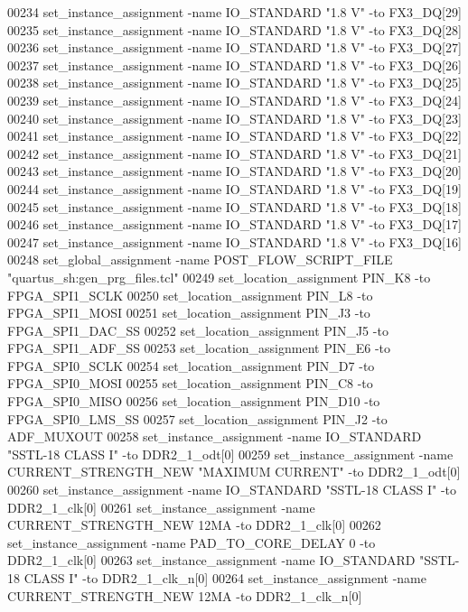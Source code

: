 \begin{DoxyCode}
00234 set\_instance\_assignment -name IO\_STANDARD "1.\textcolor{vhdllogic}{8} V" -to FX3\_DQ[29]
00235 set\_instance\_assignment -name IO\_STANDARD "1.\textcolor{vhdllogic}{8} V" -to FX3\_DQ[28]
00236 set\_instance\_assignment -name IO\_STANDARD "1.\textcolor{vhdllogic}{8} V" -to FX3\_DQ[27]
00237 set\_instance\_assignment -name IO\_STANDARD "1.\textcolor{vhdllogic}{8} V" -to FX3\_DQ[26]
00238 set\_instance\_assignment -name IO\_STANDARD "1.\textcolor{vhdllogic}{8} V" -to FX3\_DQ[25]
00239 set\_instance\_assignment -name IO\_STANDARD "1.\textcolor{vhdllogic}{8} V" -to FX3\_DQ[24]
00240 set\_instance\_assignment -name IO\_STANDARD "1.\textcolor{vhdllogic}{8} V" -to FX3\_DQ[23]
00241 set\_instance\_assignment -name IO\_STANDARD "1.\textcolor{vhdllogic}{8} V" -to FX3\_DQ[22]
00242 set\_instance\_assignment -name IO\_STANDARD "1.\textcolor{vhdllogic}{8} V" -to FX3\_DQ[21]
00243 set\_instance\_assignment -name IO\_STANDARD "1.\textcolor{vhdllogic}{8} V" -to FX3\_DQ[20]
00244 set\_instance\_assignment -name IO\_STANDARD "1.\textcolor{vhdllogic}{8} V" -to FX3\_DQ[19]
00245 set\_instance\_assignment -name IO\_STANDARD "1.\textcolor{vhdllogic}{8} V" -to FX3\_DQ[18]
00246 set\_instance\_assignment -name IO\_STANDARD "1.\textcolor{vhdllogic}{8} V" -to FX3\_DQ[17]
00247 set\_instance\_assignment -name IO\_STANDARD "1.\textcolor{vhdllogic}{8} V" -to FX3\_DQ[16]
00248 set\_global\_assignment -name POST\_FLOW\_SCRIPT\_FILE "quartus\_sh:gen\_prg\_files.tcl"
00249 set\_location\_assignment PIN\_K8 -to FPGA\_SPI1\_SCLK
00250 set\_location\_assignment PIN\_L8 -to FPGA\_SPI1\_MOSI
00251 set\_location\_assignment PIN\_J3 -to FPGA\_SPI1\_DAC\_SS
00252 set\_location\_assignment PIN\_J5 -to FPGA\_SPI1\_ADF\_SS
00253 set\_location\_assignment PIN\_E6 -to FPGA\_SPI0\_SCLK
00254 set\_location\_assignment PIN\_D7 -to FPGA\_SPI0\_MOSI
00255 set\_location\_assignment PIN\_C8 -to FPGA\_SPI0\_MISO
00256 set\_location\_assignment PIN\_D10 -to FPGA\_SPI0\_LMS\_SS
00257 set\_location\_assignment PIN\_J2 -to ADF\_MUXOUT
00258 set\_instance\_assignment -name IO\_STANDARD "SSTL-18 CLASS I" -to DDR2\_1\_odt[0]
00259 set\_instance\_assignment -name CURRENT\_STRENGTH\_NEW "MAXIMUM CURRENT" -to DDR2\_1\_odt[0]
00260 set\_instance\_assignment -name IO\_STANDARD "SSTL-18 CLASS I" -to DDR2\_1\_clk[0]
00261 set\_instance\_assignment -name CURRENT\_STRENGTH\_NEW 12MA -to DDR2\_1\_clk[0]
00262 set\_instance\_assignment -name PAD\_TO\_CORE\_DELAY \textcolor{vhdllogic}{0} -to DDR2\_1\_clk[0]
00263 set\_instance\_assignment -name IO\_STANDARD "SSTL-18 CLASS I" -to DDR2\_1\_clk\_n[0]
00264 set\_instance\_assignment -name CURRENT\_STRENGTH\_NEW 12MA -to DDR2\_1\_clk\_n[0]

\end{DoxyCode}
